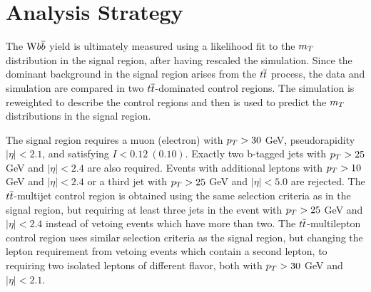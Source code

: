 \section{Analysis Strategy}\label{subsec:wbb_analysisstrategy}
The $\mathrm{W} b\overline{b}$ yield is ultimately measured using a likelihood fit
 to the $m_T$ distribution in the signal region,
 after having rescaled the simulation. 
Since the dominant background in the signal region arises
 from the $t\overline{t}$ process, the data and simulation
 are compared in two $t\overline{t}$-dominated control regions.
The simulation is reweighted to describe the control regions
 and then is used to predict the $m_T$ distributions
 in the signal region.


The signal region requires a muon (electron)
 with $p_T > 30$ GeV, pseudorapidity
 $|\eta| < 2.1$, and satisfying $I < 0.12~(0.10)$.
Exactly two b-tagged jets with
 $p_T > 25$ GeV and
 $|\eta| < 2.4$ are also required. %
Events with additional leptons with
 $p_T > 10$ GeV and $|\eta| < 2.4$ or
 a third jet with $p_T > 25$ GeV and $|\eta| < 5.0$
 are rejected.
The $t\overline{t}$-multijet control region is obtained
 using the same selection criteria as in the signal region,
 but requiring at least three jets in the event
 with $p_T>25$ GeV and $|\eta|<2.4$ instead of
 vetoing events which have more than two.
The $t\overline{t}$-multilepton control region uses
 similar selection criteria as the signal region,
 but changing the lepton requirement from vetoing
 events which contain a second lepton,
 to requiring two isolated leptons of different flavor,
 both with $p_T>30$ GeV and $|\eta|<2.1$.

